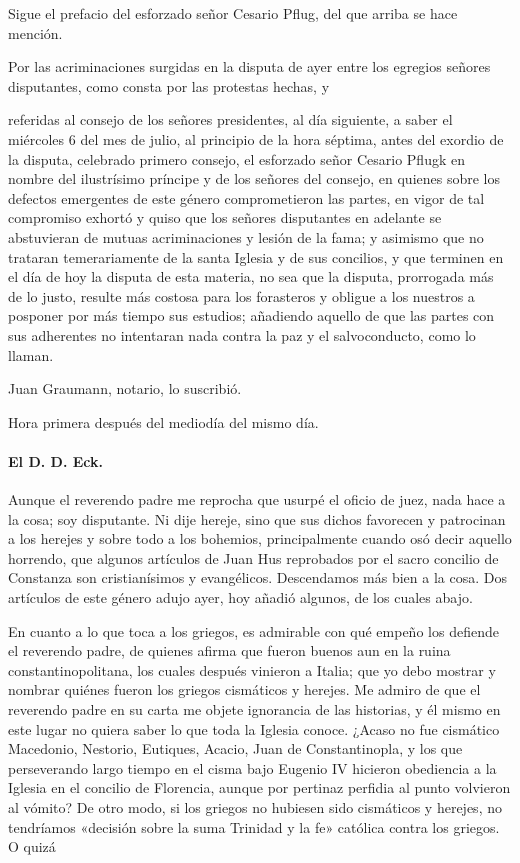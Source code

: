 Sigue el prefacio del esforzado señor Cesario Pflug, del que arriba se hace mención.

Por las acriminaciones surgidas en la disputa de ayer entre los egregios señores disputantes, como consta por las protestas hechas, y

referidas al consejo de los señores presidentes, al día siguiente, a saber el miércoles 6 del mes de julio, al principio de la hora séptima, antes del exordio de la disputa, celebrado primero consejo, el esforzado señor Cesario Pflugk en nombre del ilustrísimo príncipe y de los señores del consejo, en quienes sobre los defectos emergentes de este género comprometieron las partes, en vigor de tal compromiso exhortó y quiso que los señores disputantes en adelante se abstuvieran de mutuas acriminaciones y lesión de la fama; y asimismo que no trataran temerariamente de la santa Iglesia y de sus concilios, y que terminen en el día de hoy la disputa de esta materia, no sea que la disputa, prorrogada más de lo justo, resulte más costosa para los forasteros y obligue a los nuestros a posponer por más tiempo sus estudios; añadiendo aquello de que las partes con sus adherentes no intentaran nada contra la paz y el salvoconducto, como lo llaman.

Juan Graumann, notario, lo suscribió.

Hora primera después del mediodía del mismo día.

\paragraph*{El D. D. Eck.}

Aunque el reverendo padre me reprocha que usurpé el oficio de juez, nada hace a la cosa; soy disputante. Ni dije hereje, sino que sus dichos favorecen y patrocinan a los herejes y sobre todo a los bohemios, principalmente cuando osó decir aquello horrendo, que algunos artículos de Juan Hus reprobados por el sacro concilio de Constanza son cristianísimos y evangélicos. Descendamos más bien a la cosa. Dos artículos de este género adujo ayer, hoy añadió algunos, de los cuales abajo.

En cuanto a lo que toca a los griegos, es admirable con qué empeño los defiende el reverendo padre, de quienes afirma que fueron buenos aun en la ruina constantinopolitana, los cuales después vinieron a Italia; que yo debo mostrar y nombrar quiénes fueron los griegos cismáticos y herejes. Me admiro de que el reverendo padre en su carta me objete ignorancia de las historias, y él mismo en este lugar no quiera saber lo que toda la Iglesia conoce. ¿Acaso no fue cismático Macedonio, Nestorio, Eutiques, Acacio, Juan de Constantinopla, y los que perseverando largo tiempo en el cisma bajo Eugenio IV hicieron obediencia a la Iglesia en el concilio de Florencia, aunque por pertinaz perfidia al punto volvieron al vómito? De otro modo, si los griegos no hubiesen sido cismáticos y herejes, no tendríamos «decisión sobre la suma Trinidad y la fe» católica contra los griegos. O quizá

